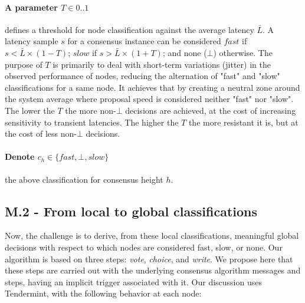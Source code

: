 \paragraph{A parameter $T \in {0..1}$} defines a threshold for node classification against the average latency $\bar{L}$. A latency sample $s$ for a consensus instance can be considered $fast$ if $s < \bar{L} \times (1-T)$; $slow$ if $s > \bar{L} \times (1+T)$; and none ($\bot$) otherwise.  
%
%
%
The purpose of $T$ is primarily to deal with short-term variations (jitter) in the observed performance of nodes,
reducing the alternation of "fast" and "slow" classifications for a same node. 
It achieves that by creating a neutral zone around the system average where proposal speed is considered neither "fast" nor "slow". The lower the $T$ the more non-$\bot$ decisions are achieved, at the cost of increasing sensitivity to transient latencies. The higher the $T$ the more resistant it is, but at the cost of less non-$\bot$ decisions. %


\paragraph{Denote $c_h \in \{ fast, \bot, slow \}$} the above classification for consensus height $h$.

\subsection{M.2 - From local to global classifications}

Now, the challenge is to derive, from these local classifications, meaningful global decisions with respect to which nodes are considered fast, slow, or none.  
%
Our algorithm is based on three steps: \textit{vote}, \textit{choice}, and \textit{write}.   We propose here that these steps are carried out with the underlying consensus algorithm messages and steps, having an implicit trigger associated with it.  Our discussion uses Tendermint, with the following behavior at each node:

